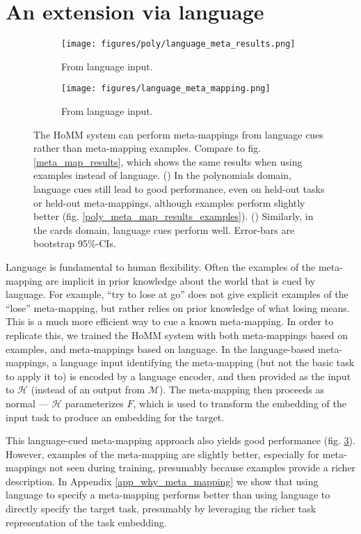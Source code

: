 \documentclass{article}
\begin{document}
\section{An extension via language}
\vspace{-0.5em} %
\begin{figure}
\centering
\begin{subfigure}{0.5\textwidth}
\texttt{[image: figures/poly/language\_meta\_results.png]}
\caption{From language input.}
\label{poly_meta_map_results_language}
\end{subfigure}%
\begin{subfigure}{0.5\textwidth}
\texttt{[image: figures/language\_meta\_mapping.png]}
\caption{From language input.}
\label{cards_meta_map_results_language}
\end{subfigure}
\caption{The HoMM system can perform meta-mappings from language cues rather than meta-mapping examples. Compare to fig. \ref{meta_map_results}, which shows the same results when using examples instead of language. () In the polynomials domain, language cues still lead to good performance, even on held-out tasks or held-out meta-mappings, although examples perform slightly better (fig. \ref{poly_meta_map_results_examples}). () Similarly, in the cards domain, language cues perform well. Error-bars are bootstrap 95\%-CIs.}
\label{language_meta_map_results}
\end{figure}
Language is fundamental to human flexibility. Often the examples of the meta-mapping are implicit in prior knowledge about the world that is cued by language. For example, ``try to lose at go'' does not give explicit examples of the ``lose'' meta-mapping, but rather relies on prior knowledge of what losing means. This is a much more efficient way to cue a known meta-mapping. In order to replicate this, we trained the HoMM system with both meta-mappings based on examples, and meta-mappings based on language. In the language-based meta-mappings, a language input identifying the meta-mapping (but not the basic task to apply it to) is encoded by a language encoder, and then provided as the input to $\mathcal{H}$ (instead of an output from $\mathcal{M}$). The meta-mapping then proceeds as normal --- $\mathcal{H}$ parameterizes $F$, which is used to transform the embedding of the input task to produce an embedding for the target. \par
This language-cued meta-mapping approach also yields good performance (fig. \ref{language_meta_map_results}). However, examples of the meta-mapping are slightly better, especially for meta-mappings not seen during training, presumably because examples provide a richer description. In Appendix \ref{app_why_meta_mapping} we show that using language to specify a meta-mapping performs better than using language to directly specify the target task, presumably by leveraging the richer task representation of the task embedding. \par
\end{document}
